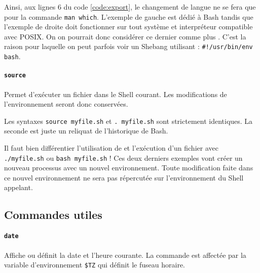 Ainsi, aux lignes 6 du code \ref{code:export}, le changement de langue ne se fera que pour la commande \texttt{man which}. L'exemple de gauche est dédié à Bash tandis que l'exemple de droite doit fonctionner sur tout système et interpréteur compatible avec POSIX. On on pourrait donc considérer ce dernier comme plus . C'est la raison pour laquelle on peut parfois voir un Shebang utilisant  : \texttt{#!/usr/bin/env bash}.

\paragraph{\texttt{source}} 
Permet d'exécuter un fichier dans le Shell courant. Les modifications de l'environnement seront donc conservées. 

 Les syntaxes \texttt{source myfile.sh} et \texttt{. myfile.sh} sont strictement identiques. La seconde est juste un reliquat de l'historique de Bash.

 Il faut bien différentier l'utilisation de  et l'exécution d'un fichier avec \texttt{./myfile.sh} ou \texttt{bash myfile.sh} ! Ces deux derniers exemples vont créer un nouveau processus avec un nouvel environnement. Toute modification faite dans ce nouvel environnement ne sera pas répercutée sur l'environnement du Shell appelant.

\newpage
\subsection{Commandes utiles}
\vspace{-5mm}

\paragraph{\texttt{date}} 
Affiche ou définit la date et l'heure courante. La commande est affectée par la variable d'environnement \texttt{\$TZ} qui définit le fuseau horaire. 

